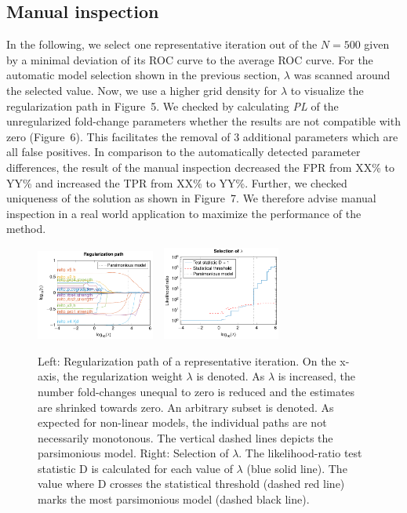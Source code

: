 \documentclass{bioinfo}
\begin{document}
\subsection{Manual inspection}
In the following, we select one representative iteration out of the $N=500$ given by a minimal deviation of its ROC curve to the average ROC curve.
For the automatic model selection shown in the previous section, $\lambda$ was scanned around the selected value.
Now, we use a higher grid density for $\lambda$ to visualize the regularization path in Figure~5\vphantom{\ref{fig:05}}.
We checked by calculating \emph{PL} of the unregularized fold-change parameters whether the results are not compatible with zero (Figure~6\vphantom{\ref{fig:06}}).
This facilitates the removal of 3 additional parameters which are all false positives.
In comparison to the automatically detected parameter differences, the result of the manual inspection decreased the FPR from XX\% to YY\% and increased the TPR from XX\% to YY\%.
Further, we checked uniqueness of the solution as shown in Figure~7\vphantom{\ref{fig:07}}.
We therefore advise manual inspection in a real world application to maximize the performance of the method.

\begin{figure}[!tpb]%
\centerline{\includegraphics[width=110pt]{Figures/l1_tree.pdf}~~\includegraphics[width=110pt]{Figures/l1_selection.pdf}}
\caption{Left: Regularization path of a representative iteration. On the x-axis, the regularization weight $\lambda$ is denoted. As $\lambda$ is increased, the number fold-changes unequal to zero is reduced and the estimates are shrinked towards zero. An arbitrary subset is denoted. As expected for non-linear models, the individual paths are not necessarily monotonous. The vertical dashed lines depicts the parsimonious model. Right: Selection of $\lambda$. The likelihood-ratio test statistic D is calculated for each value of $\lambda$ (blue solid line). The value where D crosses the statistical threshold (dashed red line) marks the most parsimonious model (dashed black line).}\label{fig:05}
\end{figure}
\end{document}
